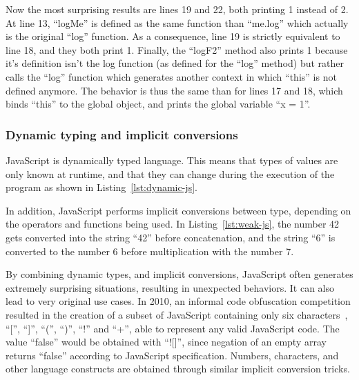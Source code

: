 Now the most surprising results are lines 19 and 22, both printing 1 instead of 2.
At line 13, ``logMe'' is defined as the same function than ``me.log'' which
actually is the original ``log'' function.
As a consequence, line 19 is strictly equivalent to line 18, and they both print 1.
Finally, the ``logF2'' method also prints 1 because it's definition isn't the log function
(as defined for the ``log'' method) but rather calls the ``log'' function which
generates another context in which ``this'' is not defined anymore.
The behavior is thus the same than for lines 17 and 18, which binds ``this'' to the global object,
and prints the global variable ``x = 1''.

\subsubsection{Dynamic typing and implicit conversions}%
\label{ssub:dynamic_typing_and_implicit_conversions}

JavaScript is dynamically typed language.
This means that types of values are only known at runtime,
and that they can change during the execution of the program
as shown in Listing~\ref{lst:dynamic-js}.



In addition, JavaScript performs implicit conversions between type,
depending on the operators and functions being used.
In Listing~\ref{lst:weak-js}, the number 42 gets converted into the string ``42''
before concatenation, and the string ``6'' is converted to the number 6
before multiplication with the number 7.



By combining dynamic types, and implicit conversions,
JavaScript often generates extremely surprising situations,
resulting in unexpected behaviors.
It can also lead to very original use cases.
In 2010, an informal code obfuscation competition resulted in the creation
of a subset of JavaScript containing only six characters~\cite{jsfuck},
``['', ``]'', ``('', ``)'', ``!'' and ``+'',
able to represent any valid JavaScript code.
The value ``false'' would be obtained with ``![]'',
since negation of an empty array returns ``false'' according to JavaScript specification.
Numbers, characters, and other language constructs are obtained through similar
implicit conversion tricks.

